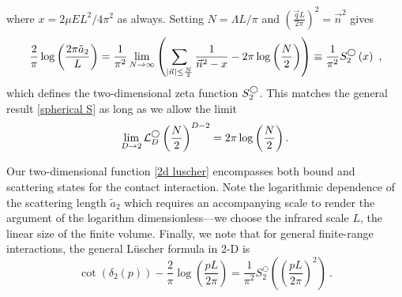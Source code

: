 where $x=2\mu EL^2/4\pi^2$ as always.
Setting $N=\Lambda L/\pi$ and $\left(\frac{\vec{q}L}{2\pi}\right)^2=\vec{n}^2$ gives
\begin{equation}
    \frac{2}{\pi} \log \left(\frac{2\pi \tilde a_{2}}{L}\right)
    =
    \frac{1}{\pi^2}
    \lim_{N\to\infty}
    \left(
        \sum_{|\vec{n}|\le \frac{N}{2}} \frac{1}{\vec{n}^2-x}
        -2\pi \log \left(\frac{N}{2}\right)
    \right)
    \equiv
    \frac{1}{\pi^2}S^{\bigcirc}_2\left(x\right)\ ,\label{eq:2d luscher}
\end{equation}
which defines the two-dimensional zeta function $S^{\bigcirc}_2$.
This matches the general result \eqref{spherical S} as long as we allow the limit
\begin{equation}
    \lim_{D\to2}\mathcal{L}_D^\bigcirc \left(\frac{N}{2}\right)^{D-2}=2\pi \log \left(\frac{N}{2}\right).
\end{equation}

Our two-dimensional \Luscher function \eqref{2d luscher} encompasses both bound and scattering states for the contact interaction.
Note the logarithmic dependence of the scattering length $\tilde a_{2}$ which requires an accompanying scale to render the argument of the logarithm dimensionless---we choose the infrared scale $L$, the linear size of the finite volume.
Finally, we note that for general finite-range interactions, the general L\"uscher formula in 2-D is
\begin{equation}\label{eq:full 2d luescher}
\cot(\delta_{2}(p))-\frac{2}{\pi}\log\left(\frac{pL}{2\pi}\right) = \frac{1}{\pi^2}S^\bigcirc_2\left(\left(\frac{pL}{2\pi}\right)^2\right)\ .
\end{equation}
